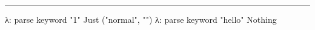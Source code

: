 \documentclass[]{article}
\newenvironment{Shaded}{}{}
\newcommand{\DataTypeTok}[1]{\textcolor[rgb]{0.56,0.13,0.00}{{#1}}}
\newcommand{\StringTok}[1]{\textcolor[rgb]{0.25,0.44,0.63}{{#1}}}
\newcommand{\FunctionTok}[1]{\textcolor[rgb]{0.02,0.16,0.49}{{#1}}}
\newcommand{\NormalTok}[1]{{#1}}
\begin{document}
\begin{center}\rule{0.5\linewidth}{\linethickness}\end{center}

\begin{Shaded}
\begin{Highlighting}[]
\NormalTok{λ}\FunctionTok{:} \NormalTok{parse keyword }\StringTok{"1"}
\DataTypeTok{Just} \NormalTok{(}\StringTok{"normal"}\NormalTok{, }\StringTok{""}\NormalTok{)}
\NormalTok{λ}\FunctionTok{:} \NormalTok{parse keyword }\StringTok{"hello"}
\DataTypeTok{Nothing}
\end{Highlighting}
\end{Shaded}
\end{document}

